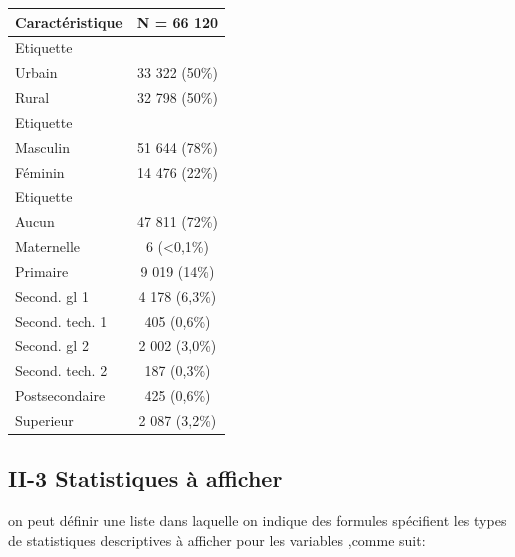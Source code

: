 \documentclass[
]{article}
\begin{document}
\begin{longtable}[]{@{}lc@{}}
\toprule\noalign{}
\textbf{Caractéristique} & \textbf{N = 66 120} \\
\midrule\noalign{}
\endhead
\bottomrule\noalign{}
\endlastfoot
Etiquette & \\
Urbain & 33 322 (50\%) \\
Rural & 32 798 (50\%) \\
Etiquette & \\
Masculin & 51 644 (78\%) \\
Féminin & 14 476 (22\%) \\
Etiquette & \\
Aucun & 47 811 (72\%) \\
Maternelle & 6 (\textless0,1\%) \\
Primaire & 9 019 (14\%) \\
Second. gl 1 & 4 178 (6,3\%) \\
Second. tech. 1 & 405 (0,6\%) \\
Second. gl 2 & 2 002 (3,0\%) \\
Second. tech. 2 & 187 (0,3\%) \\
Postsecondaire & 425 (0,6\%) \\
Superieur & 2 087 (3,2\%) \\
\end{longtable}

\hypertarget{ii-3-statistiques-uxe0-afficher}{%
\subsection{II-3 Statistiques à
afficher}\label{ii-3-statistiques-uxe0-afficher}}

on peut définir une liste dans laquelle on indique des formules
spécifient les types de statistiques descriptives à afficher pour les
variables ,comme suit:
\end{document}
